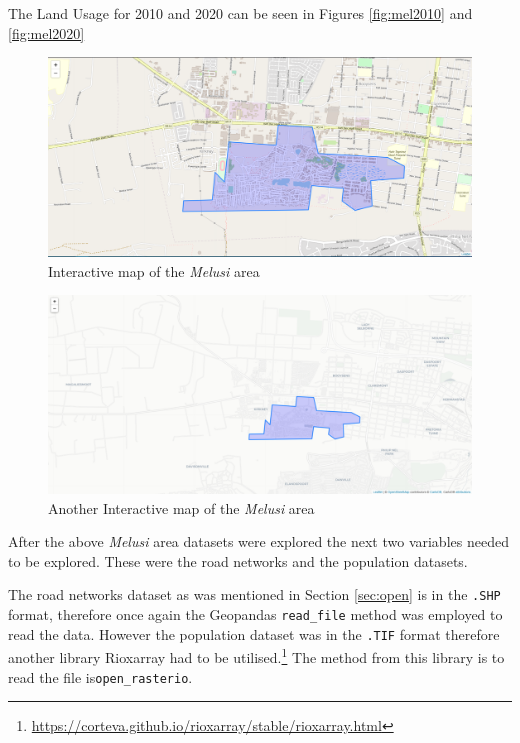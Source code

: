 The Land Usage for 2010 and 2020 can be seen in Figures \ref{fig:mel2010} and \ref{fig:mel2020}
\begin{landscape}
\centering
\begin{figure}[!h]
\includegraphics[scale=0.6]{Figures/Chapter3/Folium}
\caption{Interactive map of the \textit{Melusi} area}
\label{fig:fol}
\end{figure}

\pagebreak

\centering
\begin{figure}[!h]
\includegraphics[scale=0.6]{Figures/Chapter3/Folium2}
\caption{Another Interactive map of the \textit{Melusi} area}
\label{fig:fol2}
\end{figure}
\end{landscape}
After the above \textit{Melusi} area datasets were explored the next two variables needed to be explored. These were the road networks and the population datasets.

The road networks dataset as was mentioned in Section \ref{sec:open} is in the \texttt{.SHP} format, therefore once again the Geopandas \texttt{read\_file} method was employed to read the data. However the population dataset was in the \texttt{.TIF} format therefore another library Rioxarray had to be utilised.\footnote{\url{https://corteva.github.io/rioxarray/stable/rioxarray.html}} The method from this library is to read the file is\texttt{open\_rasterio}.

